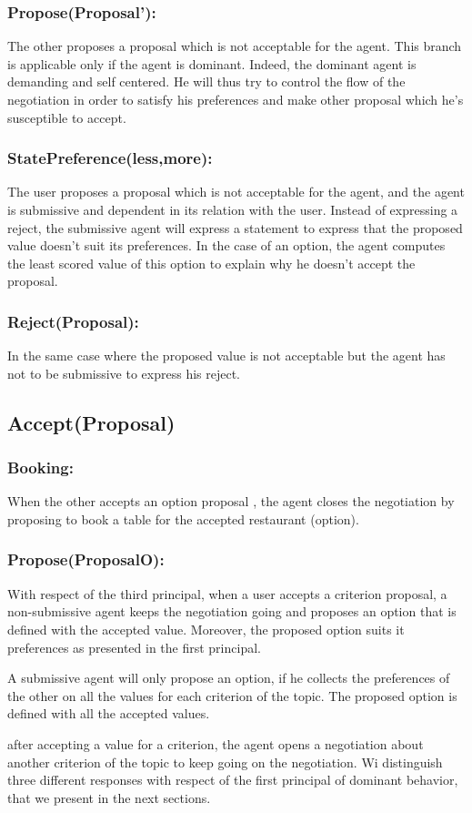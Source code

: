 \documentclass{llncs}
\begin{document}
 
 \subsubsection{Propose(Proposal'):} The other proposes a proposal which is not acceptable for the agent. This branch is applicable only if the agent is dominant. Indeed, the dominant agent is demanding and self centered. He will thus try to control the flow of the negotiation in order to satisfy his preferences and  make other proposal which he's susceptible to accept.
 
 \subsubsection{StatePreference(less,more):} The user proposes a proposal which is not acceptable for the agent, and the agent is submissive and dependent in its relation with the user. Instead of expressing a reject, the submissive agent will express a statement to express that the proposed value doesn't suit its preferences. In the case of an option, the agent computes the least scored value of this option to explain why he doesn't accept the proposal.
 
 \subsubsection{Reject(Proposal):} In the same case where the proposed value is not acceptable but the agent has not to be submissive to express his reject.
 
 \subsection{Accept(Proposal)}
 \subsubsection{Booking: } When the other accepts an option proposal , the agent closes the negotiation by proposing to book a table for the accepted restaurant (option).
 
 \subsubsection{Propose(ProposalO):} With respect of the third principal, when a user accepts a criterion proposal, a non-submissive agent keeps  the negotiation going and proposes an option that is defined with the accepted value. Moreover, the proposed option suits it preferences as presented in the first principal. 
 \par A submissive agent will only propose an option, if he collects the preferences of the other on all the values for each criterion of the topic.  The proposed option is defined with all the accepted values.
 \par after accepting a value for a criterion, the agent opens a negotiation about another criterion of the topic to keep going on the negotiation. Wi distinguish three different responses with respect of the first principal of dominant behavior, that we present in the next sections.
 
\end{document}
